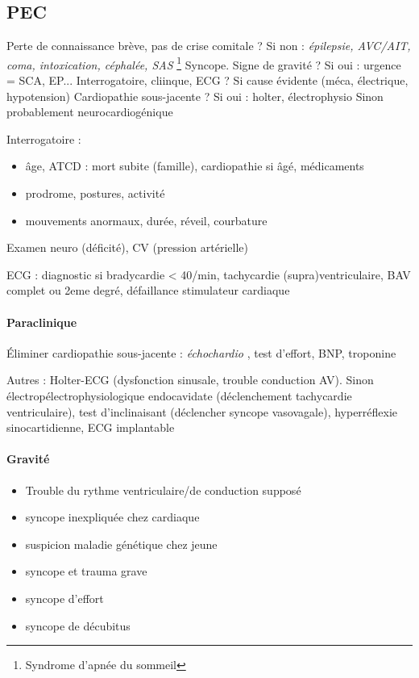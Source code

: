 \documentclass{article}
\begin{document}
\subsection{PEC}
\begin{algorithm}
   Perte de connaissance brève, pas de crise comitale ? Si non : \textit{épilepsie,
    AVC/AIT, coma, intoxication, céphalée, SAS} \footnote{Syndrome d'apnée du
    sommeil} \faHandStopO\;
   Syncope. Signe de gravité ? Si oui : urgence = SCA, EP... \faHandStopO\;
   Interrogatoire, cliinque, ECG ? Si cause évidente (méca, électrique,
    hypotension) \faHandStopO\;
   Cardiopathie sous-jacente ? Si oui : holter, électrophysio\;
   Sinon probablement neurocardiogénique
\end{algorithm}

Interrogatoire :
\begin{itemize}
  \item âge, ATCD : mort subite (famille), cardiopathie si âgé, médicaments
  \item prodrome, postures, activité
  \item mouvements anormaux, durée, réveil, courbature
\end{itemize}
Examen neuro (déficité), CV (pression artérielle)

ECG : diagnostic si bradycardie < 40/min, tachycardie (supra)ventriculaire, BAV
complet ou 2eme degré, défaillance stimulateur cardiaque

\paragraph{Paraclinique}
Éliminer cardiopathie sous-jacente : \textit{échochardio} , test d'effort, BNP,
troponine

Autres : Holter-ECG (dysfonction sinusale, trouble conduction AV). Sinon
électropélectrophysiologique endocavidate (déclenchement tachycardie
ventriculaire), test d'inclinaisant (déclencher syncope vasovagale),
hyperréflexie sinocartidienne, ECG implantable

\paragraph{Gravité}
\begin{itemize}
  \item Trouble du rythme ventriculaire/de conduction supposé
  \item syncope inexpliquée chez cardiaque
  \item suspicion maladie génétique chez jeune
  \item syncope et trauma grave
  \item syncope d'effort
  \item syncope de décubitus
\end{itemize}
\end{document}
